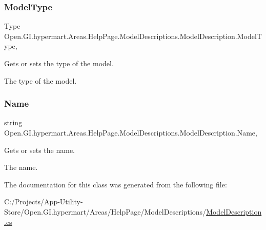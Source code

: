 \subsubsection{\texorpdfstring{Model\+Type}{ModelType}}
{\footnotesize\ttfamily Type Open.\+G\+I.\+hypermart.\+Areas.\+Help\+Page.\+Model\+Descriptions.\+Model\+Description.\+Model\+Type\hspace{0.3cm}{\ttfamily [get]}, {\ttfamily [set]}}



Gets or sets the type of the model. 

The type of the model. \hypertarget{class_open_1_1_g_i_1_1hypermart_1_1_areas_1_1_help_page_1_1_model_descriptions_1_1_model_description_aa5a42ec74b1d880ce15fd12b8ef0baf9}{}\label{class_open_1_1_g_i_1_1hypermart_1_1_areas_1_1_help_page_1_1_model_descriptions_1_1_model_description_aa5a42ec74b1d880ce15fd12b8ef0baf9} 
\subsubsection{\texorpdfstring{Name}{Name}}
{\footnotesize\ttfamily string Open.\+G\+I.\+hypermart.\+Areas.\+Help\+Page.\+Model\+Descriptions.\+Model\+Description.\+Name\hspace{0.3cm}{\ttfamily [get]}, {\ttfamily [set]}}



Gets or sets the name. 

The name. 

The documentation for this class was generated from the following file\+:\begin{DoxyCompactItemize}
\item 
C\+:/\+Projects/\+App-\/\+Utility-\/\+Store/\+Open.\+G\+I.\+hypermart/\+Areas/\+Help\+Page/\+Model\+Descriptions/\hyperlink{_model_description_8cs}{Model\+Description.\+cs}\end{DoxyCompactItemize}
